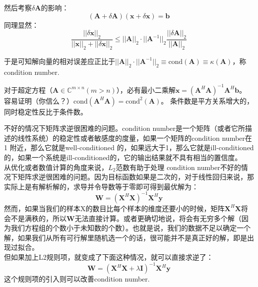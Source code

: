 \documentclass[11pt,fleqn, UTF8]{ctexbook} %
\begin{document}
\begin{itemize}
{  然后考察$\delta\boldsymbol{A}$的影响：
  \begin{equation*}
    (\boldsymbol{A}+\delta\boldsymbol{A})(\boldsymbol{x}+\delta\boldsymbol{x})=\boldsymbol{b}
  \end{equation*}
  同理显然：
  \begin{equation*}
    \frac{||\delta\boldsymbol{x}||_2}{||\boldsymbol{x}||_2+||\delta\boldsymbol{x}||_2}\leq||\boldsymbol{A}||_2\cdot||\boldsymbol{A}^{-1}||_2\frac{||\delta\boldsymbol{A}||_2}{||\boldsymbol{A}||_2}
  \end{equation*}

  于是可知解向量的相对误差应正比于$||\boldsymbol{A}||_2\cdot||\boldsymbol{A}^{-1}||_2\equiv\text{cond}(\boldsymbol{A})\equiv\kappa(\boldsymbol{A})$，称condition number.

  对于超定方程（$\boldsymbol{A}\in\mathbb{C}^{m\times n}(m>n)$），必有最小二乘解$\boldsymbol{x}=(\boldsymbol{A}^H\boldsymbol{A})^{-1}\boldsymbol{A}^H\boldsymbol{b}$。 容易证明（你信么？）$\text{cond}(\boldsymbol{A}^H\boldsymbol{A})=\text{cond}^2(\boldsymbol{A})$。 条件数是平方关系增大的，同时稳定性反比于条件数。
  }不好的情况下矩阵求逆很困难的问题。condition number是一个矩阵（或者它所描述的线性系统）的稳定性或者敏感度的度量，如果一个矩阵的condition number在1 附近，那么它就是well-conditioned 的，如果远大于1，那么它就是ill-conditioned 的，如果一个系统是ill-conditioned的，它的输出结果就不具有相当的置信度。\\
  从优化或者数值计算的角度来说，$L_2$范数有助于处理 condition number不好的情况下矩阵求逆很困难的问题。因为目标函数如果是二次的，对于线性回归来说，那实际上是有解析解的，求导并令导数等于零即可得到最优解为：
  \begin{equation*}
    \boldsymbol{W}=(\boldsymbol{X}^H\boldsymbol{X})^{-1}\boldsymbol{X}^H\boldsymbol{y}
  \end{equation*}
  然而，如果当我们的样本X的数目比每个样本的维度还要小的时候，矩阵$\boldsymbol{X}^H\boldsymbol{X}$将会不是满秩的，所以$\boldsymbol{W}$无法直接计算。或者更确切地说，将会有无穷多个解（因为我们方程组的个数小于未知数的个数）。也就是说，我们的数据不足以确定一个解，如果我们从所有可行解里随机选一个的话，很可能并不是真正好的解，即是出现过拟合。\\
  但如果加上L2规则项，就变成了下面这种情况，就可以直接求逆了：
  \begin{equation*}
    \boldsymbol{W}=(\boldsymbol{X}^H\boldsymbol{X}+\lambda\boldsymbol{I})^{-1}\boldsymbol{X}^H\boldsymbol{y}
  \end{equation*}
  这个规则项的引入则可以改善condition number.


\end{itemize}
\end{document}
